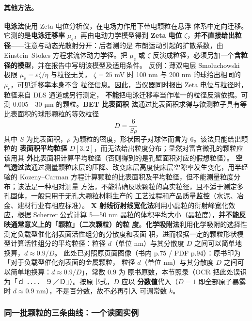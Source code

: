 \paragraph{其他方法。}\textbf{电泳法}使用 Zeta 电位分析仪，在电场力作用下带电颗粒在悬浮
体系中定向迁移。它测的是\textbf{电泳迁移率} $\mu_{\mathrm{e}}$，再由电动力学模型得到
\textbf{Zeta 电位} $\zeta$，\textbf{并不直接给出粒径}——注意与动态光散射分开：后者测的是
布朗运动引起的扩散系数，由 Einstein--Stokes 方程求流体动力学径。把 $\mu_{\mathrm{e}}$ 或
$\zeta$ 反演成粒径，必须另加一个\textbf{含粒径的模型}，并在报告中写明该模型及适用条件。
反例：薄双电层 Smoluchowski 极限 $\mu_{\mathrm{e}}=\varepsilon\zeta/\eta$ 与粒径无关，
$\zeta=25$ mV 时 100 nm 与 200 nm 的球给出相同的 $\mu_{\mathrm{e}}$，可见迁移率本身不含
粒径信息。因此，当仪器同时报出 Zeta 电位与粒径时，粒径来自 DLS 通道或另行测定，
\textbf{不能}把电泳迁移率当作唯一的粒径反演依据。可测 0.005—30 µm 的颗粒。\textbf{BET 比表面积
法}通过比表面积求得与欲测粒子具有等比表面积的球形颗粒的等效粒径
\begin{equation}\label{eq:ch01c-betd}
D=\frac{6}{S\rho}
\end{equation}
其中 $S$ 为比表面积，$\rho$ 为颗粒的密度，形状因子对球体而言为 6。该法只能给出颗粒的
\textbf{表面积平均粒径} $D[3,2]$，而无法给出粒度分布；显然对富含微孔的颗粒应该用其
\textbf{外}比表面积计算平均粒径（否则得到的是孔壁面积对应的假想粒径）。
\textbf{空气透过法}通过测量颗粒床层的压降、改变床层高度使床层空隙率发生变化，用半经验的
Kozeny--Carman 方程计算颗粒的比表面积及平均粒径，但不能测量粒度分布；该法是一种相对测量
方法，不能精确反映颗粒的真实粒径，且不适于测定多孔固体，一般只用于无孔大颗粒材料生产的
工艺过程和产品质量监控（水泥、冶金、建材行业有相应标准）。
\textbf{X 射线衍射线宽化法}利用小晶粒的衍射峰宽化效应，根据 Scherrer 公式计算 5—50 nm
晶粒的体积平均大小（晶粒度），\textbf{并不能反映通常意义上的「颗粒」（二次颗粒）的粒
度}。\textbf{化学吸附法}利用化学吸附的选择性测定负载型催化剂表面活性组分的分散度和表面
积，进而根据一定的颗粒形状模型计算活性组分的平均粒径：粒径 $d$（单位 nm）与其分散度 $D$
之间可以简单地换算，$d\approx0.9/D$。
此处已对照原页面图像（书内 p.75 / PDF p.94）：原书印为「对于负载型催化剂表面的金属颗粒，
粒径 $d$（单位 nm）与其分散度 $D$ 之间可以简单地换算：$d\approx0.9/D$」，常数 $0.9$ 为
原书原数，本节照录（OCR 把此处误识为「ｄ ．．．． ９／Ｄ」）。按原书式，$D$ 应以
\textbf{分数值}代入（$D=1$ 即全部原子暴露时 $d\approx0.9$ nm），不是百分数，故不必再引入
可调常数 $k$。

\subsubsection{同一批颗粒的三条曲线：一个读图实例}

